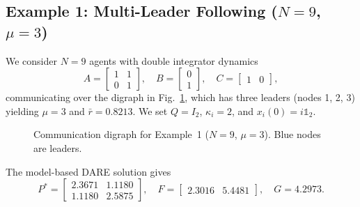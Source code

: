 \documentclass[12pt]{elsarticle}
\theoremstyle{remark}
\newcommand{\ones}{\mathbb{1}}
\begin{document}
\subsection{Example 1: Multi-Leader Following ($N = 9$, $\mu = 3$)}
\label{subsec:sim1}

We consider $N = 9$ agents with double integrator dynamics
\begin{equation}
A = \begin{bmatrix} 1 & 1 \\ 0 & 1 \end{bmatrix}, \quad B = \begin{bmatrix} 0 \\ 1 \end{bmatrix}, \quad C = \begin{bmatrix} 1 & 0 \end{bmatrix},
\label{eq:AB_ex1}
\end{equation}
communicating over the digraph in Fig.~\ref{fig:graph9}, which has three leaders (nodes 1, 2, 3) yielding $\mu = 3$ and $\bar{r} = 0.8213$. We set $Q = I_2$, $\kappa_i = 2$, and $x_i(0) = i\ones_2$.

\begin{figure}[!htb]
\centering
{}
\caption{Communication digraph for Example~1 ($N=9$, $\mu=3$). Blue nodes are leaders.}
\label{fig:graph9}
\end{figure}

The model-based DARE solution gives
\begin{equation*}
P^* = \begin{bmatrix} 2.3671 & 1.1180 \\ 1.1180 & 2.5875 \end{bmatrix}, \quad
F = \begin{bmatrix} 2.3016 & 5.4481 \end{bmatrix}, \quad G = 4.2973.
\end{equation*}
\end{document}
